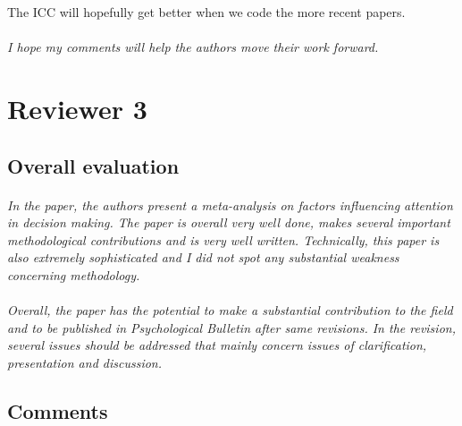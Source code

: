 \documentclass[english,natbib,man,floatsintext]{apa6}
\newcommand\eatpunct[1]{}
\newcommand{\com}[2][]{\vspace{5mm}\paragraph[ ]{ \eatpunct}\label{#1}\emph{#2}\vspace{5mm}}
\begin{document}
The ICC will hopefully get better when we code the more recent papers.


\com[com-r2-XX]{I hope my comments will help the authors move their work forward.}




\section{Reviewer 3}
\label{rev:r3}

\subsection{Overall evaluation}
\label{rev:r3sum}

\com[com-r3-eval]{In the paper, the authors present a meta-analysis on factors influencing attention in decision making. The paper is overall very well done, makes several important methodological contributions and is very well written. Technically, this paper is also extremely sophisticated and I did not spot any substantial weakness concerning methodology.\\
\\
Overall, the paper has the potential to make a substantial contribution to the field and to be published in Psychological Bulletin after same revisions. In the revision, several issues should be addressed that mainly concern issues of clarification, presentation and discussion.} 


\subsection{Comments}
\end{document}
